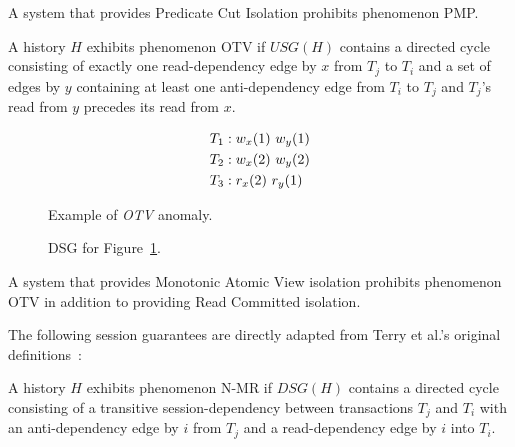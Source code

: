 \begin{definition}
A system that provides Predicate Cut Isolation prohibits phenomenon PMP.
\end{definition}

\begin{definition}
\label{def:otv}
A history $H$ exhibits phenomenon OTV if $USG(H)$ contains a directed
cycle consisting of exactly one read-dependency edge by $x$ from $T_j$
to $T_i$ and a set of edges by $y$ containing at least one
anti-dependency edge from $T_i$ to $T_j$ and $T_j$'s read from $y$
precedes its read from $x$.
\end{definition}
\begin{figure}[H]
\begin{align*}
\small
T_1 &: w_x(1)~w_y(1)\\
T_2 &: w_x(2)~w_y(2)\\
T_3 &: r_x(2)~r_y(1)
\end{align*}
\caption{Example of \textit{OTV} anomaly.}
\label{fig:nta-history}
\end{figure}

\begin{figure}[H]
\centering
{}
\caption{DSG for Figure~\ref{fig:nta-history}.}
\label{fig:nta-dsg}
\end{figure}

\begin{definition}
A system that provides Monotonic Atomic View isolation prohibits
phenomenon OTV in addition to providing Read Committed isolation.
\end{definition}

The following session guarantees are directly adapted from Terry et
al.'s original definitions~\cite{sessionguarantees}:

\begin{definition}
A history $H$ exhibits phenomenon N-MR if $DSG(H)$ contains a directed cycle
consisting of a transitive session-dependency between transactions
$T_j$ and $T_i$ with an anti-dependency edge by $i$ from $T_j$ and a
read-dependency edge by $i$ into $T_i$.
\end{definition}

